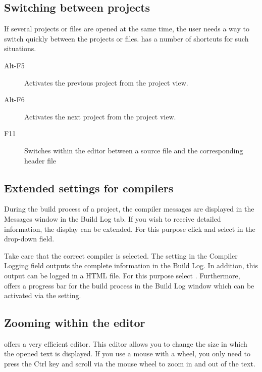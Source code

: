 \subsection{Switching between projects}

If several projects or files are opened at the same time, the user needs a way to switch quickly between the projects or files. \codeblocks has a number of shortcuts for such situations.

\begin{description}
\item[Alt-F5] Activates the previous project from the project view.
\item[Alt-F6] Activates the next project from the project view.
\item[F11] Switches within the editor between a source file  and the corresponding header file 
\end{description}

\subsection{Extended settings for compilers}

During the build process of a project, the compiler messages are displayed in the Messages window in the Build Log tab. If you wish to receive detailed information, the display can be extended. For this purpose click  and select  in the drop-down field.


Take care that the correct compiler is selected. The  setting in the Compiler Logging field outputs the complete information in the Build Log. In addition, this output can be logged in a HTML file. For this purpose select .
Furthermore, \codeblocks offers a progress bar for the build process in the Build Log window which can be activated via the  setting.

\subsection{Zooming within the editor}

\codeblocks offers a very efficient editor. This editor allows you to change the size in which the opened text is displayed. If you use a mouse with a wheel, you only need to press the Ctrl key and scroll via the mouse wheel to zoom in and out of the text.

